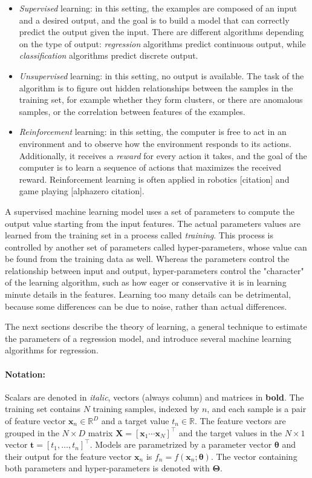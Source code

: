 \documentclass[12pt]{book}
\begin{document}
\begin{itemize}
\item \emph{Supervised} learning: in this setting, the examples are composed of an input and a desired output, and the goal is to build a model that can correctly predict the output given the input. There are different algorithms depending on the type of output: \emph{regression} algorithms predict continuous output, while \emph{classification} algorithms predict discrete output.

\item \emph{Unsupervised} learning: in this setting, no output is available. The task of the algorithm is to figure out hidden relationships between the samples in the training set, for example whether they form clusters, or there are anomalous samples, or the correlation between features of the examples.

\item \emph{Reinforcement} learning: in this setting, the computer is free to act in an environment and to observe how the environment responds to its actions. Additionally, it receives a \emph{reward} for every action it takes, and the goal of the computer is to learn a sequence of actions that maximizes the received reward. Reinforcement learning is often applied in robotics [citation] and game playing [alphazero citation].
\end{itemize}

A supervised machine learning model uses a set of parameters to compute the output value starting from the input features. The actual parameters values are learned from the training set in a process called \emph{training}. This process is controlled by another set of parameters called hyper-parameters, whose value can be found from the training data as well. Whereas the parameters control the relationship between input and output, hyper-parameters control the "character" of the learning algorithm, such as how eager or conservative it is in learning minute details in the features. Learning too many details can be detrimental, because some differences can be due to noise, rather than actual differences.

The next sections describe the theory of learning, a general technique to estimate the parameters of a regression model, and introduce several machine learning algorithms for regression.

\paragraph{Notation:} Scalars are denoted in \textit{italic}, vectors (always column) and matrices in \textbf{bold}. The training set contains $N$ training samples, indexed by $n$, and each sample is a pair of feature vector $\bm x_n\in\mathbb{R}^D$ and a target value $t_n\in\mathbb{R}$. The feature vectors are grouped in the $N\times D$ matrix $\bm X=\left[\bm x_1\dotsb\bm x_N\right]^\intercal$ and the target values in the $N\times 1$ vector $\bm t=\left[t_1,\ldots,t_n\right]^\intercal$. Models are parametrized by a parameter vector $\bm\theta$ and their output for the feature vector $\bm x_n$ is $f_n=f(\bm x_n;\bm\theta)$. The vector containing both parameters and hyper-parameters is denoted with $\bm\Theta$.
\end{document}
